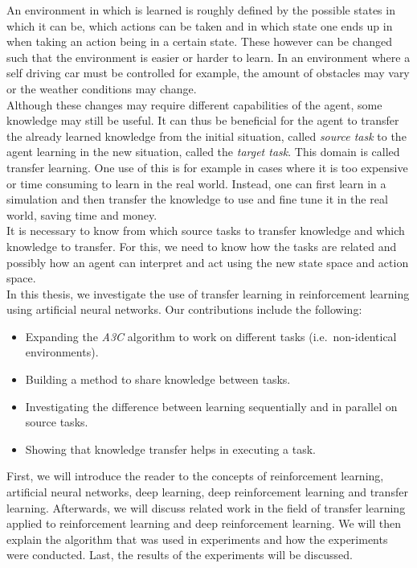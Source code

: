 An environment in which is learned is roughly defined by the possible states in which it can be, which actions can be taken and in which state one ends up in when taking an action being in a certain state.
These however can be changed such that the environment is easier or harder to learn.
In an environment where a self driving car must be controlled for example, the amount of obstacles may vary or the weather conditions may change.\\
Although these changes may require different capabilities of the agent, some knowledge may still be useful.
It can thus be beneficial for the agent to transfer the already learned knowledge from the initial situation, called \textit{source task} to the agent learning in the new situation, called the \textit{target task}.
This domain is called transfer learning. One use of this is for example in cases where it is too expensive or time consuming to learn in the real world. Instead, one can first learn in a simulation and then transfer the knowledge to use and fine tune it in the real world, saving time and money.\\
It is necessary to know from which source tasks to transfer knowledge and which knowledge to transfer.
For this, we need to know how the tasks are related and possibly how an agent can interpret and act using the new state space and action space.\\

In this thesis, we investigate the use of transfer learning in reinforcement learning using artificial neural networks. Our contributions include the following:
\begin{itemize}
    \item Expanding the \textit{A3C} algorithm to work on different tasks (i.e.\ non-identical environments).
    \item Building a method to share knowledge between tasks.
    \item Investigating the difference between learning sequentially and in parallel on source tasks.
    \item Showing that knowledge transfer helps in executing a task.
\end{itemize}
First, we will introduce the reader to the concepts of reinforcement learning, artificial neural networks, deep learning, deep reinforcement learning and transfer learning.
Afterwards, we will discuss related work in the field of transfer learning applied to reinforcement learning and deep reinforcement learning.
We will then explain the algorithm that was used in experiments and how the experiments were conducted.
Last, the results of the experiments will be discussed.
